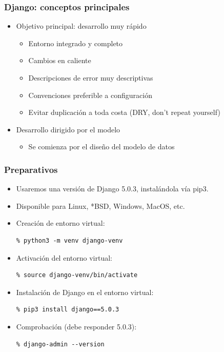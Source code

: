 \begin{frame}
\frametitle{Django: conceptos principales}

\begin{itemize}
\item Objetivo principal: desarrollo muy rápido
  \begin{itemize}
  \item Entorno integrado y completo
  \item Cambios en caliente
  \item Descripciones de error muy descriptivas
  \item Convenciones preferible a configuración
  \item Evitar duplicación a toda costa (DRY, don't repeat yourself)
  \end{itemize}
\item Desarrollo dirigido por el modelo
  \begin{itemize}
  \item Se comienza por el diseño del modelo de datos
  \end{itemize}
\end{itemize}

\end{frame}


\begin{frame}[fragile]
\frametitle{Preparativos}

\begin{itemize}
\item Usaremos una versión de Django 5.0.3, instalándola vía pip3.
\item Disponible para Linux, *BSD, Windows, MacOS, etc.
\item Creación de entorno virtual:

\begin{verbatim}
% python3 -m venv django-venv    
\end{verbatim}

\item Activación del entorno virtual:

\begin{verbatim}
% source django-venv/bin/activate
\end{verbatim}

\item Instalación de Django en el entorno virtual:

\begin{verbatim}
% pip3 install django==5.0.3
\end{verbatim}

\item Comprobación (debe responder 5.0.3):
\begin{verbatim}
% django-admin --version
\end{verbatim}
\end{itemize}


\end{frame}


